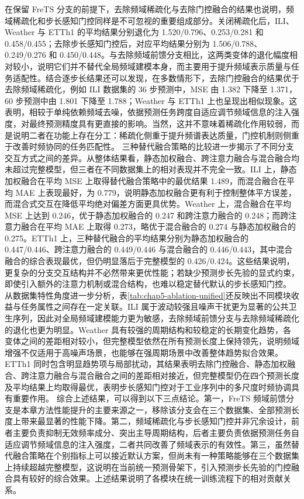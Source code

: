 在保留 FreTS 分支的前提下，去除频域稀疏化与去除门控融合的结果也说明，频域稀疏化和步长感知门控同样是不可忽视的重要组成部分。关闭稀疏化后，ILI、Weather 与 ETTh1 的平均结果分别退化为 1.520/0.796、0.253/0.281 和 0.458/0.455；去除步长感知门控后，对应平均结果分别为 1.506/0.788、0.249/0.276 和 0.450/0.448。与去除频域前馈分支相比，这两类变体的退化幅度相对较小，说明它们并不替代全局频域建模本身，而主要用于提升频域表示质量与任务适配性。结合逐步长结果还可以发现，在多数情形下，去除门控融合的结果优于去除频域稀疏化，例如 ILI 数据集的 36 步预测中，MSE 由 1.382 下降至 1.371，60 步预测中由 1.801 下降至 1.788；Weather 与 ETTh1 上也呈现出相似现象。这表明，相较于单纯依赖频域去噪，依据预测任务跨度自适应调节频域信息的注入强度，对最终预测精度具有更直接的影响。当然，这并不意味着稀疏化作用较弱，而是说明二者在功能上存在分工：稀疏化侧重于提升频谱表达质量，门控机制则侧重于改善时频协同的任务匹配性。 三种替代融合策略的比较进一步揭示了不同分支交互方式之间的差异。从整体结果看，静态加权融合、跨注意力融合与混合融合均未超过完整模型，但三者在不同数据集上的相对表现并不完全一致。ILI 上，静态加权融合在平均 MSE 上取得替代融合策略中的最优结果 1.489，而混合融合在平均 MAE 上表现最好，为 0.779，说明静态加权融合更有利于控制整体平方误差，而混合式交互在降低平均绝对偏差方面更具优势。Weather 上，混合融合在平均 MSE 上达到 0.246，优于静态加权融合的 0.247 和跨注意力融合的 0.248；而跨注意力融合在平均 MAE 上取得 0.273，略优于混合融合的 0.274 与静态加权融合的 0.275。ETTh1 上，三种替代融合的平均结果分别为静态加权融合的 0.447/0.446、跨注意力融合的 0.449/0.446 与混合融合的 0.446/0.443，其中混合融合的综合表现最优，但仍明显落后于完整模型的 0.426/0.424。这些结果说明，更复杂的分支交互结构并不必然带来更优性能；若缺少预测步长先验的显式约束，即使引入额外的注意力机制或混合结构，也难以稳定替代默认的步长感知门控。 从数据集特性角度进一步分析，表\ref{tab:chap5-ablation-unified}还反映出不同模块收益与任务属性之间存在一定关联。ILI 属于波动较强且噪声干扰更为显著的公共卫生序列，因此对全局频域建模能力更为敏感，去除频域前馈分支与去除频域稀疏化的退化也更为明显。Weather 具有较强的周期结构和较稳定的长期变化趋势，各变体之间的差距相对较小，但完整模型依然在所有预测长度上保持领先，说明频域增强不仅适用于高噪声场景，也能够在强周期场景中改善整体趋势拟合效果。ETTh1 同时包含明显趋势项与局部扰动，其结果表明去除门控融合、静态加权融合、跨注意力融合与混合融合之间的差距相对接近，但完整模型仍在四个预测长度及平均结果上均取得最优，表明步长感知门控对于工业序列中的多尺度时频协调具有重要作用。 综合上述结果，可以得到以下三点结论。第一，FreTS 频域前馈分支是本章方法性能提升的主要来源之一，移除该分支会在三个数据集、全部预测长度上带来最显著的性能下降。第二，频域稀疏化与步长感知门控并非冗余设计，前者主要负责抑制无效频率成分、突出主导周期结构，后者主要负责依据预测任务自适应调节频域信息的注入强度，二者共同改善了频域表示的有效性。第三，虽然替代融合策略在个别指标上可以接近默认方案，但尚未有一种策略能够在三个数据集上持续超越完整模型，这说明在当前统一预测骨架下，引入预测步长先验的门控融合具有较好的综合效果。上述结果说明了各模块在统一训练流程下的相对贡献关系。

